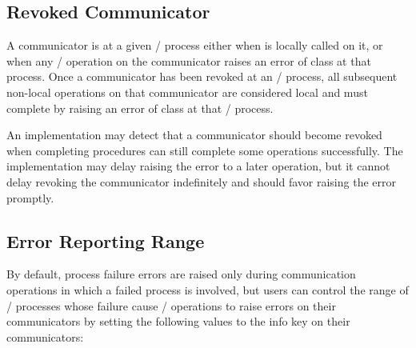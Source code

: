 \subsection{Revoked Communicator}

A communicator is 
at a given \MPI/ process either when
 is locally called on it, or when any \MPI/
operation on the communicator raises an error of class
 at that process. Once a
communicator has been revoked at an \MPI/ process, all subsequent non-local operations on
that communicator are considered
local and must complete by raising an error of class
 at that \MPI/ process.

\begin{implementors}
An implementation may detect that a communicator should become revoked
when completing procedures can still complete some operations successfully.
The implementation may delay raising the  error to a later operation,
but it cannot delay revoking the communicator indefinitely and should favor
raising the error promptly.
\end{implementors}


\subsection{Error Reporting Range}
\label{sec:ft-modes}

By default, process failure errors are raised only during communication operations
in which a failed process is involved, but
users can control the range of \MPI/ processes whose failure cause \MPI/ operations
to raise errors on their communicators by setting the following values to the
info key  on their communicators:

